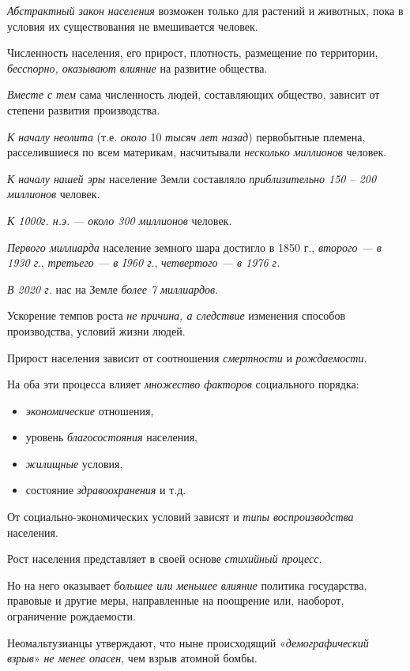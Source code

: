 \documentclass[a4paper,14pt,russian]{extreport}
\begin{document}
\emph{Абстрактный закон населения} возможен только для растений и животных, пока в условия их существования не вмешивается человек.

Численность населения, его прирост, плотность, размещение по территории, \emph{бесспорно, оказывают влияние} на развитие общества.

\emph{Вместе с тем} сама численность людей, составляющих общество, зависит от степени развития производства.

\emph{К началу неолита} (т.е. \emph{около} 10 \emph{тысяч лет назад}) первобытные племена, расселившиеся по всем материкам, насчитывали \emph{несколько миллионов} человек.

\emph{К началу нашей эры} население Земли составляло \emph{приблизительно 150 -- 200 миллионов} человек.

\emph{К 1000г. н.э}. --- \emph{около 300 миллионов} человек.

\emph{Первого миллиарда} население земного шара достигло в 1850 г., \emph{второго --- в 1930 г}., \emph{третьего --- в I960 г}., \emph{четвертого --- в 1976 г.}

\emph{В 2020 г.} нас на Земле \emph{более 7 миллиардов}.

Ускорение темпов роста \emph{не причина, а следствие} изменения способов производства, условий жизни людей.

Прирост населения зависит от соотношения \emph{смертности} и \emph{рождаемости}.

На оба эти процесса влияет \emph{множество факторов} социального порядка:

\begin{itemize}
\item \emph{экономические} отношения,
\item уровень \emph{благосостояния} населения,
\item \emph{жилищные} условия,
\item состояние \emph{здравоохранения} и т.д.
\end{itemize}

От социально-экономических условий зависят и \emph{типы воспроизводства} населения.

Рост населения представляет в своей основе \emph{стихийный процесс}.

Но на него оказывает \emph{большее или меньшее влияние} политика государства, правовые и другие меры, направленные на поощрение или, наоборот, ограничение рождаемости.

Неомальтузианцы утверждают, что ныне происходящий «\emph{демографический взрыв}» \emph{не менее опасен}, чем взрыв атомной бомбы.
\end{document}
